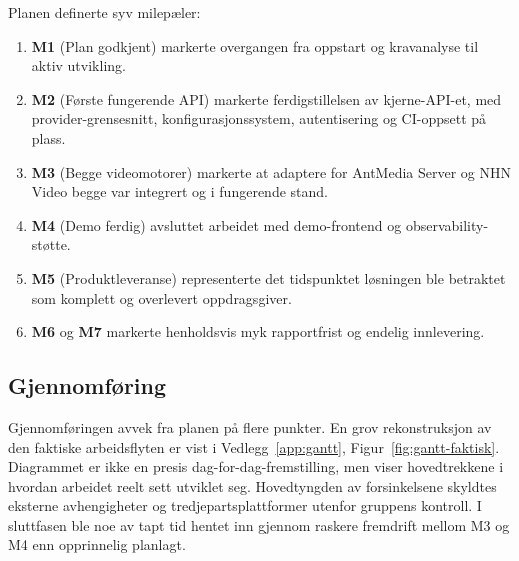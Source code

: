 Planen definerte syv milepæler:
\begin{enumerate}
    \item \textbf{M1} (Plan godkjent) markerte overgangen fra oppstart og kravanalyse til aktiv utvikling.
    \item \textbf{M2} (Første fungerende API) markerte ferdigstillelsen av kjerne-API-et, med provider-grensesnitt, konfigurasjonssystem, autentisering og CI-oppsett på plass.
    \item \textbf{M3} (Begge videomotorer) markerte at adaptere for AntMedia Server og NHN Video begge var integrert og i fungerende stand.
    \item \textbf{M4} (Demo ferdig) avsluttet arbeidet med demo-frontend og observability-støtte.
    \item \textbf{M5} (Produktleveranse) representerte det tidspunktet løsningen ble betraktet som komplett og overlevert oppdragsgiver.
    \item \textbf{M6} og \textbf{M7} markerte henholdsvis myk rapportfrist og endelig innlevering.
\end{enumerate}

\subsection{Gjennomføring}



Gjennomføringen avvek fra planen på flere punkter. En grov rekonstruksjon av den faktiske arbeidsflyten er vist i Vedlegg~\ref{app:gantt}, Figur~\ref{fig:gantt-faktisk}. Diagrammet er ikke en presis dag-for-dag-fremstilling, men viser hovedtrekkene i hvordan arbeidet reelt sett utviklet seg. Hovedtyngden av forsinkelsene skyldtes eksterne avhengigheter og tredjepartsplattformer utenfor gruppens kontroll. I sluttfasen ble noe av tapt tid hentet inn gjennom raskere fremdrift mellom M3 og M4 enn opprinnelig planlagt.

